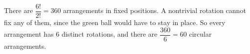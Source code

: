 There are $\dfrac{6!}{2!}=360$ arrangements in fixed positions. A nontrivial rotation cannot fix any of them, since the green ball would have to stay in place. So every arrangement has $6$ distinct rotations, and there are $\dfrac{360}{6}=\boxed{60}$ circular arrangements.
